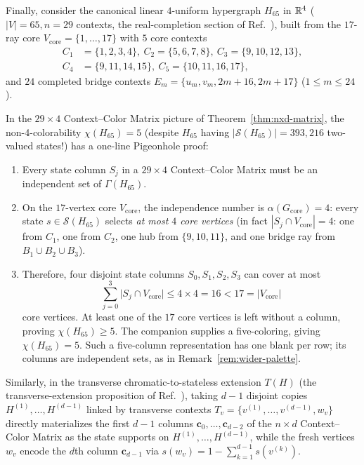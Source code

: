 \documentclass[aps,pra,reprint,superscriptaddress,longbibliography,nofootinbib,floatfix,10pt]{revtex4-2}
\theoremstyle{definition}\newtheorem{definition}[theorem]{Definition}
\theoremstyle{remark}\newtheorem{remark}[theorem]{Remark}
\newcommand{\Sc}{\mathcal S}\newcommand{\Cc}{\mathcal C}
\begin{document}
Finally, consider the canonical linear $4$-uniform hypergraph $H_{65}$ in $\mathbb R^4$ ($|V|=65,n=29$ contexts, the real-completion section of Ref.~\cite{svozil2026contexts}), built from the $17$-ray core $V_{\mathrm{core}}=\{1,\ldots,17\}$ with $5$ core contexts
\begin{equation}\label{eq:H65-core}
\begin{aligned}
C_1&=\{1,2,3,4\},\ C_2=\{5,6,7,8\},\ C_3=\{9,10,12,13\},\\
C_4&=\{9,11,14,15\},\ C_5=\{10,11,16,17\},
\end{aligned}
\end{equation}
and $24$ completed bridge contexts $E_m=\{u_m,v_m,2m+16,2m+17\}$ ($1\le m\le 24$).

In the $29\times 4$ Context--Color Matrix picture of Theorem~\ref{thm:nxd-matrix}, the non-4-colorability $\chi(H_{65})=5$ (despite $H_{65}$ having $|\Sc(H_{65})|=393{,}216$ two-valued states!) has a one-line Pigeonhole proof:
\begin{enumerate}
\item Every state column $S_j$ in a $29\times 4$ Context--Color Matrix must be an independent set of $\Gamma(H_{65})$.
\item On the $17$-vertex core $V_{\mathrm{core}}$, the independence number is $\alpha(G_{\mathrm{core}})=4$: every state $s\in\Sc(H_{65})$ selects \emph{at most $4$ core vertices} (in fact $|S_j\cap V_{\mathrm{core}}|=4$: one from $C_1$, one from $C_2$, one hub from $\{9,10,11\}$, and one bridge ray from $B_1\cup B_2\cup B_3$).
\item Therefore, four disjoint state columns $S_0,S_1,S_2,S_3$ can cover at most
\begin{equation}\label{eq:H65-pigeonhole}
\sum_{j=0}^{3}\bigl|S_j\cap V_{\mathrm{core}}\bigr|\le 4\times 4=16 < 17=\bigl|V_{\mathrm{core}}\bigr|
\end{equation}
core vertices. At least one of the $17$ core vertices is left without a column, proving $\chi(H_{65})\ge5$. The companion supplies a five-coloring, giving $\chi(H_{65})=5$. Such a five-column representation has one blank per row; its columns are independent sets, as in Remark~\ref{rem:wider-palette}.
\end{enumerate}

Similarly, in the transverse chromatic-to-stateless extension $T(H)$ (the transverse-extension proposition of Ref.~\cite{svozil2026contexts}), taking $d-1$ disjoint copies $H^{(1)},\ldots,H^{(d-1)}$ linked by transverse contexts $T_v=\{v^{(1)},\ldots,v^{(d-1)},w_v\}$ directly materializes the first $d-1$ columns $\mathbf{c}_0,\ldots,\mathbf{c}_{d-2}$ of the $n\times d$ Context--Color Matrix as the state supports on $H^{(1)},\ldots,H^{(d-1)}$, while the fresh vertices $w_v$ encode the $d$th column $\mathbf{c}_{d-1}$ via $s(w_v)=1-\sum_{k=1}^{d-1}s(v^{(k)})$.
\end{document}
